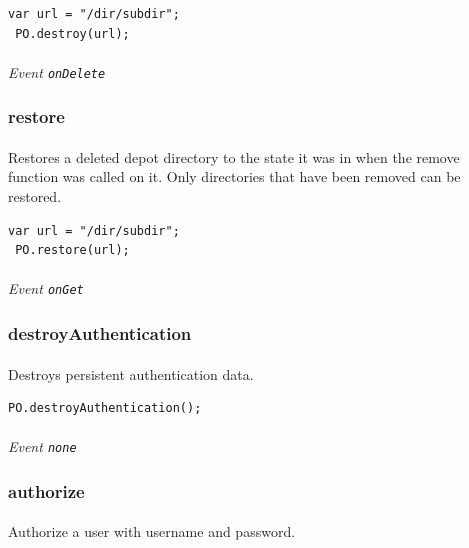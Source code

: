 \documentclass{report}
\begin{document}
\begin{Verbatim}[frame=single]
 var url = "/dir/subdir";
 PO.destroy(url);
\end{Verbatim}

\paragraph{}
\textit{Event \texttt{onDelete}}

\subsubsection{restore}
\paragraph{}
Restores a deleted depot directory to the state it was in 
when the remove function was called on it. Only directories 
that have been removed can be restored.

\begin{Verbatim}[frame=single]
 var url = "/dir/subdir";
 PO.restore(url);
\end{Verbatim}

\paragraph{}
\textit{Event \texttt{onGet}}

\subsubsection{destroyAuthentication}
\paragraph{}
Destroys persistent authentication data.

\begin{Verbatim}[frame=single]
 PO.destroyAuthentication();
\end{Verbatim}

\paragraph{}
\textit{Event \texttt{none}}

\subsubsection{authorize}
\paragraph{}
Authorize a user with username and password.
\end{document}
